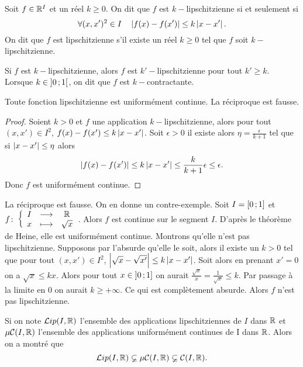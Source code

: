 \begin{defdef}
  Soit $f \in \mathbb{R}^I$ et un réel $k \geq 0$. On dit que $f$ est $k-$lipschitzienne si et seulement si
  \begin{equation}
    \forall (x,x')^2 \in I \quad \left\lvert f(x)-f(x')\right\rvert \leq k \left\lvert x-x'\right\rvert.
  \end{equation}
  On dit que $f$ est lipschitzienne s'il existe un réel $k \geq 0$ tel que $f$ soit $k-$lipschitzienne.
\end{defdef}
Si $f$ est $k-$lipschitzienne, alors $f$ est $k'-$lipschitzienne pour tout $k' \geq k$. Lorsque $k \in \left] 0 \, ;  1 \right[$, on dit que $f$ est $k-$contractante.
%
\begin{theo}
  Toute fonction lipschitzienne est uniformément continue. La réciproque est fausse.
\end{theo}
\begin{proof}
  Soient $k >0$ et $f$ une application $k-$lipschitzienne, alors pour tout $(x,x') \in I^2$, $f(x)-f(x') \leq k\left\lvert x-x'\right\rvert$. Soit $\epsilon >0$ il existe alors $\eta = \frac{\epsilon}{k+1}$ tel que si $\left\lvert x-x'\right\rvert \leq \eta$ alors 
\begin{equation}
  \left\lvert f(x)-f(x')\right\rvert \leq k\left\lvert x-x'\right\rvert \leq \frac{k}{k+1} \epsilon \leq \epsilon.
\end{equation}
Donc $f$ est uniformément continue.
\end{proof}
La réciproque est fausse. On en donne un contre-exemple. Soit $I=\left[ 0 \, ;  1 \right]$ et $f\colon \left\{\begin{array}{ccc} I & \longrightarrow &\mathbb{R}\\ x & \longmapsto & \sqrt{x} \end{array} \right.$. Alors $f$ est continue sur le segment $I$. D'après le théorème de Heine, elle est uniformément continue. Montrons qu'elle n'est pas lipschitzienne. Supposons par l'absurde qu'elle le soit, alors il existe un $k >0$ tel que pour tout $(x,x') \in I^2$, $\left\lvert\sqrt{x}-\sqrt{x'}\right\rvert \leq k\left\lvert x-x'\right\rvert$. Soit alors en prenant $x'=0$ on a $\sqrt{x} \leq k x$. Alors pour tout $x \in \left] 0 \, ;  1 \right]$ on aurait $\frac{\sqrt{x}}{x}=\frac{1}{\sqrt{x}} \leq k$. Par passage à la limite en $0$ on aurait $k \geq + \infty$. Ce qui est complètement absurde. Alors $f$ n'est pas lipschitzienne.

Si on note $\mathcal{L}ip(I,\mathbb{R})$ l'ensemble des applications lipschitziennes de $I$ dans $\mathbb{R}$ et $\mu\mathcal{C}(I,\mathbb{R})$ l'ensemble des applications uniformément continues de I dans $\mathbb{R}$. Alors on a montré que
\begin{equation}
  \mathcal{L}ip(I,\mathbb{R}) \varsubsetneq \mu\mathcal{C}(I,\mathbb{R}) \varsubsetneq \mathcal{C}(I,\mathbb{R}).
\end{equation}

